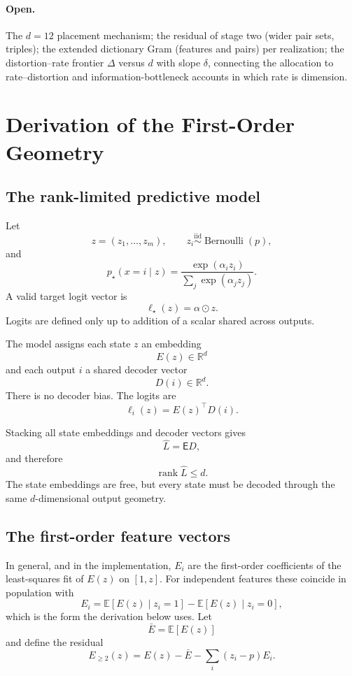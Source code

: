 \paragraph{Open.}
The \(d=12\) placement mechanism; the residual of stage two (wider pair sets, triples);
the extended dictionary Gram (features
and pairs) per realization; the distortion--rate frontier
\(\Delta\) versus \(d\) with slope \(\delta\), connecting the allocation to
rate--distortion and information-bottleneck accounts in which rate is dimension.

\appendix

\section{Derivation of the First-Order Geometry}
\label{app:first-order-geometry}

\subsection{The rank-limited predictive model}

Let
\[
z=(z_1,\ldots,z_m),
\qquad
z_i\overset{\mathrm{iid}}{\sim}\operatorname{Bernoulli}(p),
\]
and
\[
p_\star(x=i\mid z)
=
\frac{\exp(\alpha_i z_i)}
{\sum_j\exp(\alpha_jz_j)}.
\]
A valid target logit vector is
\[
\ell_\star(z)=\alpha\odot z.
\]
Logits are defined only up to addition of a scalar shared across outputs.

The model assigns each state \(z\) an embedding
\[
E(z)\in\mathbb R^d
\]
and each output \(i\) a shared decoder vector
\[
D(i)\in\mathbb R^d.
\]
There is no decoder bias. The logits are
\[
\ell_i(z)=E(z)^\top D(i).
\]

Stacking all state embeddings and decoder vectors gives
\[
\widehat L=\mathsf E D,
\]
and therefore
\[
\operatorname{rank}\widehat L\le d.
\]
The state embeddings are free, but every state must be decoded through the same
\(d\)-dimensional output geometry.

\subsection{The first-order feature vectors}

In general, and in the implementation, \(E_i\) are the first-order coefficients of the
least-squares fit of \(E(z)\) on \([1,z]\). For independent features these coincide in
population with
\begin{equation}
E_i
=
\mathbb E[E(z)\mid z_i=1]
-
\mathbb E[E(z)\mid z_i=0],
\label{eq:app-feature-vector}
\end{equation}
which is the form the derivation below uses.
Let
\[
\bar E=\mathbb E[E(z)]
\]
and define the residual
\begin{equation}
E_{\ge2}(z)
=
E(z)
-
\bar E
-
\sum_i(z_i-p)E_i.
\label{eq:app-residual}
\end{equation}

